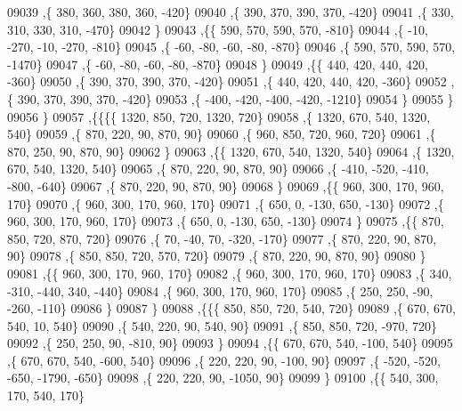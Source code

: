 \begin{DoxyCode}
09039     ,\{   380,   360,   380,   360,  -420\}
09040     ,\{   390,   370,   390,   370,  -420\}
09041     ,\{   330,   310,   330,   310,  -470\}
09042     \}
09043    ,\{\{   590,   570,   590,   570,  -810\}
09044     ,\{   -10,  -270,   -10,  -270,  -810\}
09045     ,\{   -60,   -80,   -60,   -80,  -870\}
09046     ,\{   590,   570,   590,   570, -1470\}
09047     ,\{   -60,   -80,   -60,   -80,  -870\}
09048     \}
09049    ,\{\{   440,   420,   440,   420,  -360\}
09050     ,\{   390,   370,   390,   370,  -420\}
09051     ,\{   440,   420,   440,   420,  -360\}
09052     ,\{   390,   370,   390,   370,  -420\}
09053     ,\{  -400,  -420,  -400,  -420, -1210\}
09054     \}
09055    \}
09056   \}
09057  ,\{\{\{\{  1320,   850,   720,  1320,   720\}
09058     ,\{  1320,   670,   540,  1320,   540\}
09059     ,\{   870,   220,    90,   870,    90\}
09060     ,\{   960,   850,   720,   960,   720\}
09061     ,\{   870,   250,    90,   870,    90\}
09062     \}
09063    ,\{\{  1320,   670,   540,  1320,   540\}
09064     ,\{  1320,   670,   540,  1320,   540\}
09065     ,\{   870,   220,    90,   870,    90\}
09066     ,\{  -410,  -520,  -410,  -800,  -640\}
09067     ,\{   870,   220,    90,   870,    90\}
09068     \}
09069    ,\{\{   960,   300,   170,   960,   170\}
09070     ,\{   960,   300,   170,   960,   170\}
09071     ,\{   650,     0,  -130,   650,  -130\}
09072     ,\{   960,   300,   170,   960,   170\}
09073     ,\{   650,     0,  -130,   650,  -130\}
09074     \}
09075    ,\{\{   870,   850,   720,   870,   720\}
09076     ,\{    70,   -40,    70,  -320,  -170\}
09077     ,\{   870,   220,    90,   870,    90\}
09078     ,\{   850,   850,   720,   570,   720\}
09079     ,\{   870,   220,    90,   870,    90\}
09080     \}
09081    ,\{\{   960,   300,   170,   960,   170\}
09082     ,\{   960,   300,   170,   960,   170\}
09083     ,\{   340,  -310,  -440,   340,  -440\}
09084     ,\{   960,   300,   170,   960,   170\}
09085     ,\{   250,   250,   -90,  -260,  -110\}
09086     \}
09087    \}
09088   ,\{\{\{   850,   850,   720,   540,   720\}
09089     ,\{   670,   670,   540,    10,   540\}
09090     ,\{   540,   220,    90,   540,    90\}
09091     ,\{   850,   850,   720,  -970,   720\}
09092     ,\{   250,   250,    90,  -810,    90\}
09093     \}
09094    ,\{\{   670,   670,   540,  -100,   540\}
09095     ,\{   670,   670,   540,  -600,   540\}
09096     ,\{   220,   220,    90,  -100,    90\}
09097     ,\{  -520,  -520,  -650, -1790,  -650\}
09098     ,\{   220,   220,    90, -1050,    90\}
09099     \}
09100    ,\{\{   540,   300,   170,   540,   170\}

\end{DoxyCode}
